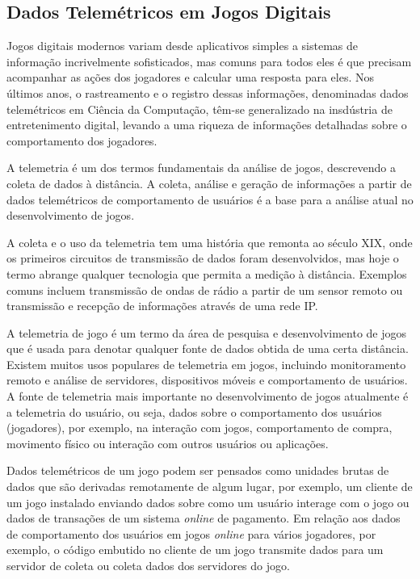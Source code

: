 \subsection{Dados Telemétricos em Jogos Digitais}
Jogos digitais modernos variam desde aplicativos simples a sistemas de informação incrivelmente sofisticados, mas comuns para todos eles é que precisam acompanhar as ações dos jogadores e calcular uma resposta para eles. Nos últimos anos, o rastreamento e o registro dessas informações, denominadas dados telemétricos em Ciência da Computação, têm-se generalizado na insdústria de entretenimento digital, levando a uma riqueza de informações detalhadas sobre o comportamento dos jogadores.

A telemetria é um dos termos fundamentais da análise de jogos, descrevendo a coleta de dados à distância. A coleta, análise e geração de informações a partir de dados telemétricos de comportamento de usuários é a base para a análise atual no desenvolvimento de jogos.

A coleta e o uso da telemetria tem uma história que remonta ao século XIX, onde os primeiros circuitos de transmissão de dados foram desenvolvidos, mas hoje o termo abrange qualquer tecnologia que permita a medição à distância. Exemplos comuns incluem transmissão de ondas de rádio a partir de um sensor remoto ou transmissão e recepção de informações através de uma rede IP.

A telemetria de jogo é um termo da área de pesquisa e desenvolvimento de jogos que é usada para denotar qualquer fonte de dados obtida de uma certa distância. Existem muitos usos populares de telemetria em jogos, incluindo monitoramento remoto e análise de servidores, dispositivos móveis e comportamento de usuários. A fonte de telemetria mais importante no desenvolvimento de jogos atualmente é a telemetria do usuário, ou seja, dados sobre o comportamento dos usuários (jogadores), por exemplo, na interação com jogos, comportamento de compra, movimento físico ou interação com outros usuários ou aplicações.

Dados telemétricos de um jogo podem ser pensados como unidades brutas de dados que são derivadas remotamente de algum lugar, por exemplo, um cliente de um jogo instalado enviando dados sobre como um usuário interage com o jogo ou dados de transações de um sistema \textit{online} de pagamento. Em relação aos dados de comportamento dos usuários em jogos \textit{online} para vários jogadores, por exemplo, o código embutido no cliente de um jogo transmite dados para um servidor de coleta ou coleta dados dos servidores do jogo.

